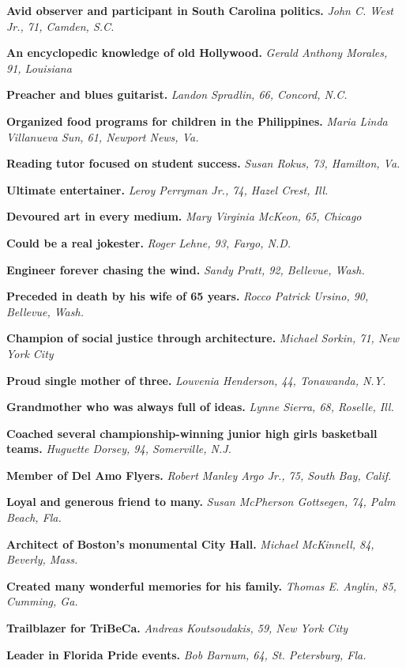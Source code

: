 \textbf{Avid observer and participant in South Carolina politics.}
\emph{John C. West Jr., 71, Camden, S.C.}

\textbf{An encyclopedic knowledge of old Hollywood.} \emph{Gerald
Anthony Morales, 91, Louisiana}

\textbf{Preacher and blues guitarist.} \emph{Landon Spradlin, 66,
Concord, N.C.}

\textbf{Organized food programs for children in the Philippines.}
\emph{Maria Linda Villanueva Sun, 61, Newport News, Va.}

\textbf{Reading tutor focused on student success.} \emph{Susan Rokus,
73, Hamilton, Va.}

\textbf{Ultimate entertainer.} \emph{Leroy Perryman Jr., 74, Hazel
Crest, Ill.}

\textbf{Devoured art in every medium.} \emph{Mary Virginia McKeon, 65,
Chicago}

\textbf{Could be a real jokester.} \emph{Roger Lehne, 93, Fargo, N.D.}

\textbf{Engineer forever chasing the wind.} \emph{Sandy Pratt, 92,
Bellevue, Wash.}

\textbf{Preceded in death by his wife of 65 years.} \emph{Rocco Patrick
Ursino, 90, Bellevue, Wash.}

\textbf{Champion of social justice through architecture.} \emph{Michael
Sorkin, 71, New York City}

\textbf{Proud single mother of three.} \emph{Louvenia Henderson, 44,
Tonawanda, N.Y.}

\textbf{Grandmother who was always full of ideas.} \emph{Lynne Sierra,
68, Roselle, Ill.}

\textbf{Coached several championship-winning junior high girls
basketball teams.} \emph{Huguette Dorsey, 94, Somerville, N.J.}

\textbf{Member of Del Amo Flyers.} \emph{Robert Manley Argo Jr., 75,
South Bay, Calif.}

\textbf{Loyal and generous friend to many.} \emph{Susan McPherson
Gottsegen, 74, Palm Beach, Fla.}

\textbf{Architect of Boston's monumental City Hall.} \emph{Michael
McKinnell, 84, Beverly, Mass.}

\textbf{Created many wonderful memories for his family.} \emph{Thomas E.
Anglin, 85, Cumming, Ga.}

\textbf{Trailblazer for TriBeCa.} \emph{Andreas Koutsoudakis, 59, New
York City}

\textbf{Leader in Florida Pride events.} \emph{Bob Barnum, 64, St.
Petersburg, Fla.}

